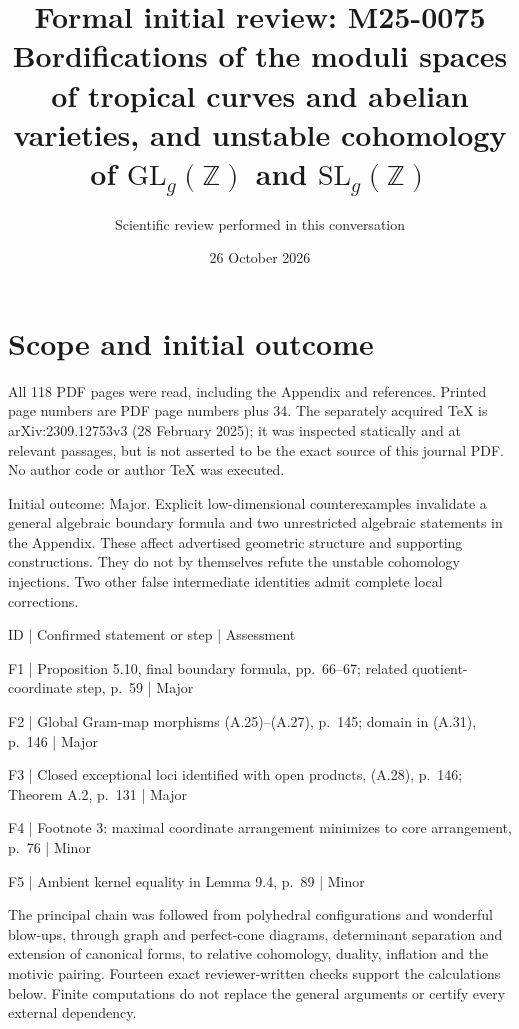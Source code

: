 \documentclass[10pt]{article}
\title{Formal initial review: M25-0075
Bordifications of the moduli spaces of tropical curves and abelian varieties, and unstable cohomology of \(\mathrm{GL}_g(\mathbb Z)\) and \(\mathrm{SL}_g(\mathbb Z)\)}
\author{Scientific review performed in this conversation}
\date{26 October 2026}
\begin{document}
\maketitle
\section*{Scope and initial outcome}
All 118 PDF pages were read, including the Appendix and references. Printed page numbers are PDF page numbers plus 34. The separately acquired TeX is arXiv:2309.12753v3 (28 February 2025); it was inspected statically and at relevant passages, but is not asserted to be the exact source of this journal PDF. No author code or author TeX was executed.\par
Initial outcome: Major. Explicit low-dimensional counterexamples invalidate a general algebraic boundary formula and two unrestricted algebraic statements in the Appendix. These affect advertised geometric structure and supporting constructions. They do not by themselves refute the unstable cohomology injections. Two other false intermediate identities admit complete local corrections.\par
ID | Confirmed statement or step | Assessment\par
F1 | Proposition 5.10, final boundary formula, pp. 66–67; related quotient-coordinate step, p. 59 | Major\par
F2 | Global Gram-map morphisms (A.25)–(A.27), p. 145; domain in (A.31), p. 146 | Major\par
F3 | Closed exceptional loci identified with open products, (A.28), p. 146; Theorem A.2, p. 131 | Major\par
F4 | Footnote 3: maximal coordinate arrangement minimizes to core arrangement, p. 76 | Minor\par
F5 | Ambient kernel equality in Lemma 9.4, p. 89 | Minor\par
The principal chain was followed from polyhedral configurations and wonderful blow-ups, through graph and perfect-cone diagrams, determinant separation and extension of canonical forms, to relative cohomology, duality, inflation and the motivic pairing. Fourteen exact reviewer-written checks support the calculations below. Finite computations do not replace the general arguments or certify every external dependency.\par
\end{document}
